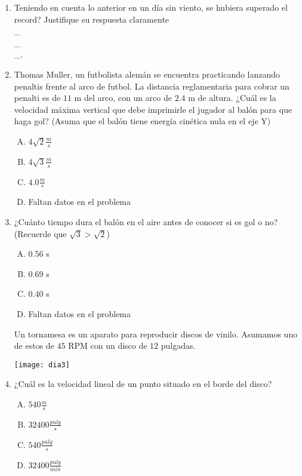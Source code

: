 \begin{enumerate}
\item Teniendo en cuenta lo anterior en un día sin viento, se hubiera superado el record? Justifique su respuesta claramente \label{dia-5} \hrulefill\\
\_\hrulefill\\
\_\hrulefill\\
\_\hrulefill.

\item Thomas Muller, un futbolista alemán se encuentra practicando lanzando penaltis frente al arco de futbol. La distancia reglamentaria para cobrar un penalti es de $11$ m del arco, con un arco de $2.4$ m de altura. \label{dia-6}
\noindent ¿Cuál es la velocidad máxima vertical que debe imprimirle el jugador al balón para que haga gol? (Asuma que el balón tiene energía cinética nula en el eje Y)

\begin{enumerate}[(A)]
\item $4 \sqrt{2}\frac{m}{s}$
\item $4 \sqrt{3}\frac{m}{s}$
\item $4.0\frac{m}{s}$
\item Faltan datos en el problema
\end{enumerate}


\item ¿Cuánto tiempo dura el balón en el aire antes de conocer si es gol o no? (Recuerde que $\sqrt{3}>\sqrt{2}$) \label{dia-7}

\begin{enumerate}[(A)]
\item $0.56$ s
\item $0.69$ s
\item $0.40$ s
\item Faltan datos en el problema
\end{enumerate}

\noindent Un tornamesa es un aparato para reproducir discos de vinilo. Asumamos uno de estos de $45$ RPM con un disco de $12$ pulgadas. 

\texttt{[image: dia3]}

\item ¿Cuál es la velocidad lineal de un punto situado en el borde del disco? \label{dia-8}

\begin{enumerate}[(A)]
\item $540\frac{m}{s}$
\item $32400\frac{pulg}{s}$
\item $540\frac{pulg}{s}$
\item $32400\frac{pulg}{min}$
\end{enumerate}


\end{enumerate}
